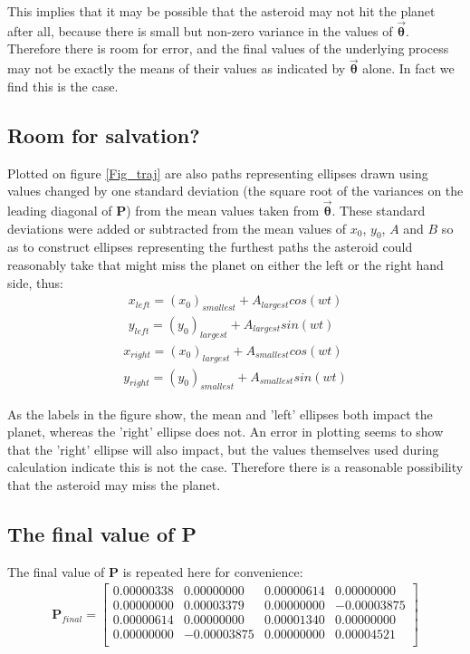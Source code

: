 \documentclass[a4paper]{article}
\begin{document}
	This implies that it may be possible that the asteroid may not hit the planet after all, because there is small but non-zero variance in the values of $\bm{\vec{\theta}}$. Therefore there is room for error, and the final values of the underlying process may not be exactly the means of their values as indicated by $\bm{\vec{\theta}}$ alone. In fact we find this is the case. \\
	
	\subsection{Room for salvation?}\label{Salvation}
	Plotted on figure \ref{Fig_traj} are also paths representing ellipses drawn using values changed by one standard deviation (the square root of the variances on the leading diagonal of $\bm{P}$) from the mean values taken from $\bm{\vec{\theta}}$. These standard deviations were added or subtracted from the mean values of $x_0$, $y_0$, $A$ and $B$ so as to construct ellipses representing the furthest paths the asteroid could reasonably take that might miss the planet on either the left or the right hand side, thus:
	\begin{align}
		x_{left}=(x_{0})_{smallest}+A_{largest}cos(wt)\\
		y_{left}=(y_{0})_{largest}+A_{largest}sin(wt)
	\end{align}
	\begin{align}
		x_{right}=(x_{0})_{largest}+A_{smallest}cos(wt)\\
		y_{right}=(y_{0})_{smallest}+A_{smallest}sin(wt)
	\end{align}
	
	 As the labels in the figure show, the mean and 'left' ellipses both impact the planet, whereas the 'right' ellipse does not. An error in plotting seems to show that the 'right' ellipse will also impact, but the values themselves used during calculation indicate this is not the case. Therefore there is a reasonable possibility that the asteroid may miss the planet.

	\subsection{The final value of P}\label{Final_value_of_P}
	The final value of $\bm{P}$ is repeated here for convenience:
	\begin{align}\label{Final_P_matrix_2}
		\bm{P}_{final}=
		\begin{bmatrix}
		0.00000338 & 	0.00000000 &	0.00000614 &	0.00000000 \\
		0.00000000 &	0.00003379 &	0.00000000 &	-0.00003875 \\
		0.00000614 &	0.00000000 &	0.00001340 &	0.00000000 \\
		0.00000000 &	-0.00003875 &	0.00000000 &	0.00004521 \\
		\end{bmatrix}
	\end{align}
	
\end{document}
